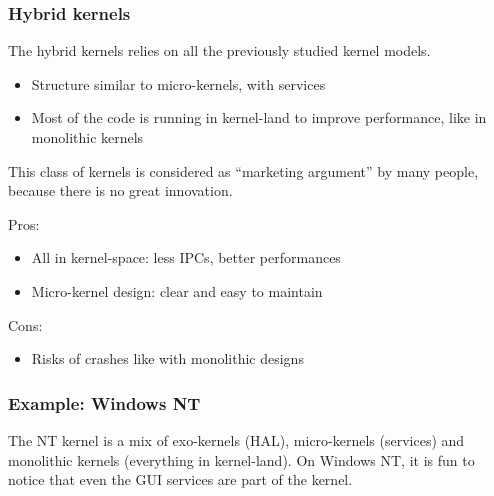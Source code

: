 %
%

\begin{frame}
  \frametitle{Hybrid kernels}

  The hybrid kernels relies on all the previously studied kernel
  models.

  \begin{itemize}
  \item
    Structure similar to micro-kernels, with services
  \item
    Most of the code is running in kernel-land to improve performance,
    like in monolithic kernels
  \end{itemize}

  This class of kernels is considered as ``marketing argument'' by
  many people, because there is no great innovation.

  \-

  Pros:

  \begin{itemize}
  \item
    All in kernel-space: less IPCs, better performances
  \item
    Micro-kernel design: clear and easy to maintain
  \end{itemize}

  \-

  Cons:

  \begin{itemize}
  \item
    Risks of crashes like with monolithic designs
  \end{itemize}

\end{frame}

%
%

\begin{frame}
  \frametitle{Example: Windows NT}

  \begin{center}
  \end{center}

  The NT kernel is a mix of exo-kernels (HAL), micro-kernels
  (services) and monolithic kernels (everything in kernel-land). On
  Windows NT, it is fun to notice that even the GUI services are part
  of the kernel.

\end{frame}

%
%

